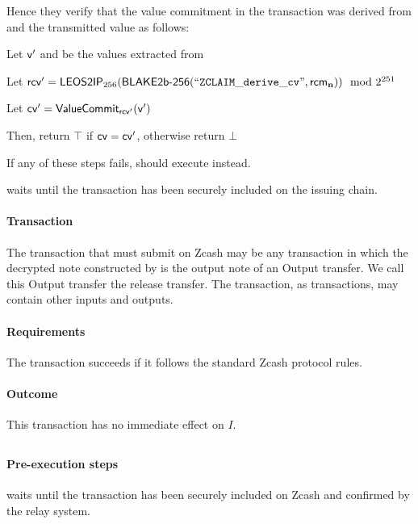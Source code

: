 \begin{enumerate}
    Hence they verify that the value commitment in the \burn transaction was derived from \rcmn and the transmitted value as follows:
    \begin{alg}
        \item Let $\mathsf{v}'$ and \rcmn be the values extracted from \nenc
        \item Let $\rcv' =\\ \leostoip_{256}(\blakezclaim(\text{``\zclaimcv''}, \rcmn)) \mod 2^{251}$
        \item Let $\mathsf{cv}' = \mathsf{ValueCommit}_{\mathsf{rcv}'}(\mathsf{v}')$
        \item Then, return $\top$ if $\mathsf{cv} = \mathsf{cv}'$, otherwise return $\bot$
    \end{alg}
\end{enumerate}
If any of these steps fails, \vault should execute \challengeRedeemop instead.

\vault waits until the \burn transaction has been securely included on the issuing chain.

\paragraph{Transaction}
The \release transaction that \vault must submit on Zcash may be any transaction in which the decrypted note \n constructed by \redeemer is the output note of an Output transfer.
We call this Output transfer the release transfer.
The \release transaction, as \lock transactions, may contain other inputs and outputs.

\paragraph{Requirements}
The \lock transaction succeeds if it follows the standard Zcash protocol rules.

\paragraph{Outcome}
This transaction has no immediate effect on $I$.

\subsection{\confirmRedeemop}
\label{sec:confirm_redeem}

\paragraph{Pre-execution steps}
\vault waits until the \release transaction has been securely included on Zcash and confirmed by the relay system.

